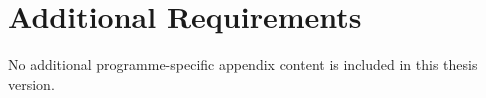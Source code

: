 \chapter{Additional Requirements}
\label{app:requirements}

No additional programme-specific appendix content is included in this thesis version.
